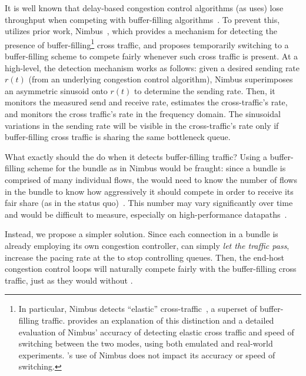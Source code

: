 It is well known that delay-based congestion control algorithms (as \name uses) lose throughput when competing with buffer-filling algorithms~\cite{copa, nimbus-arxiv}. 
To prevent this, \name utilizes prior work, Nimbus~\cite{nimbus-arxiv}, which provides a mechanism for detecting the presence of buffer-filling\footnote{In particular, Nimbus detects ``elastic'' cross-traffic~\cite{nimbus-arxiv}, a superset of buffer-filling traffic. \cite{nimbus-arxiv} provides an explanation of this distinction
and a detailed evaluation of Nimbus' accuracy of detecting elastic cross traffic and speed of switching between the two modes, using both emulated and real-world experiments. \name{}'s use of Nimbus does not impact its accuracy or speed of switching.} 
cross traffic, and proposes temporarily switching to a buffer-filling scheme to compete fairly whenever such cross traffic is present.
At a high-level, the detection mechanism works as follows: given a desired sending rate $r(t)$ (from an underlying congestion control algorithm), Nimbus superimposes an asymmetric sinusoid onto $r(t)$ to determine the sending rate. Then, it monitors the measured send and receive rate, estimates the cross-traffic's rate, and monitors the cross traffic's rate in the frequency domain. The sinusoidal variations in the sending rate will be visible in the cross-traffic's rate only if buffer-filling cross traffic is sharing the same bottleneck queue. 

What exactly should the \inbox do when it detects buffer-filling traffic? Using a buffer-filling scheme for the bundle as in Nimbus would be fraught: since a bundle is comprised of many individual flows, the \inbox would need to know the number of flows in the bundle to know how aggressively it should compete in order to receive its fair share (as in the status quo)~\cite{multcp}. 
This number may vary significantly over time and would be difficult to measure, especially on high-performance datapaths~\cite{heavy-hitters}.

Instead, we propose a simpler solution.
Since each connection in a bundle is already employing its own congestion controller, \name{} can simply \emph{let the traffic pass}, \ie{} increase the pacing rate at the \inbox to stop controlling queues.
Then, the end-host congestion control loops will naturally compete fairly with the buffer-filling cross traffic, just as they would without \name{}.

